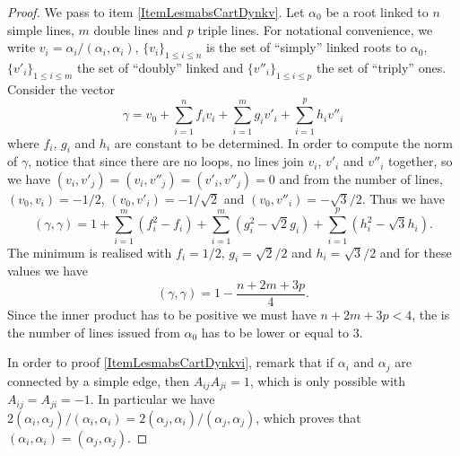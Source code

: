 \begin{proof}
    We pass to item \ref{ItemLesmabsCartDynkv}. Let \( \alpha_0\) be a root linked to \( n\) simple lines, \( m\) double lines and \( p\) triple lines. For notational convenience, we write \( v_i=\alpha_i/(\alpha_i,\alpha_i)\), \( \{ v_i \}_{1\leq i\leq n}\) is the set of ``simply'' linked roots to \( \alpha_0\), \( \{ v'_i \}_{1\leq i\leq m}\) the set of ``doubly'' linked and \( \{ v''_i \}_{1\leq i\leq p}\) the set of ``triply'' ones. Consider the vector
    \begin{equation}
        \gamma=v_0+\sum_{i=1}^nf_iv_i+\sum_{i=1}^mg_iv'_i+\sum_{i=1}^ph_iv''_i
    \end{equation}
    where \( f_i\), \( g_i\) and \( h_i\) are constant to be determined. In order to compute the norm of \( \gamma\), notice that since there are no loops, no lines join \( v_i\), \( v'_i\) and \( v''_i\) together, so we have \( (v_i,v'_j)=(v_i,v''_j)=(v'_i,v''_j)=0\) and from the number of lines, \( (v_0,v_i)=-1/2\), \( (v_0,v'_i)=-1/\sqrt{2}\) and \( (v_0,v''_i)=-\sqrt{3}/2\). Thus we have
    \begin{equation}
        (\gamma,\gamma)=1+\sum_{i=1}^m(f_i^2-f_i)+\sum_{i=1}^m(g_i^2-\sqrt{2}g_i)+\sum_{i=1}^p(h_i^2-\sqrt{3}h_i).
    \end{equation}
    The minimum is realised with \( f_i=1/2\), \( g_i=\sqrt{2}/2\) and \( h_i=\sqrt{3}/2\) and for these values we have
    \begin{equation}
        (\gamma,\gamma)=1-\frac{ n+2m+3p }{ 4 }.
    \end{equation}
    Since the inner product has to be positive we must have \( n+2m+3p<4\), the is the number of lines issued from \( \alpha_0\) has to be lower or equal to \( 3\).
   
    In order to proof \ref{ItemLesmabsCartDynkvi}, remark that if \( \alpha_i\) and \( \alpha_j\) are connected by a simple edge, then \( A_{ij}A_{ji}=1\), which is only possible with \( A_{ij}=A_{ji}=-1\). In particular we have \( 2(\alpha_i,\alpha_j)/(\alpha_i,\alpha_i)=2(\alpha_j,\alpha_i)/(\alpha_j,\alpha_j)\), which proves that \( (\alpha_i,\alpha_i)=(\alpha_j,\alpha_j)\).


\end{proof}
